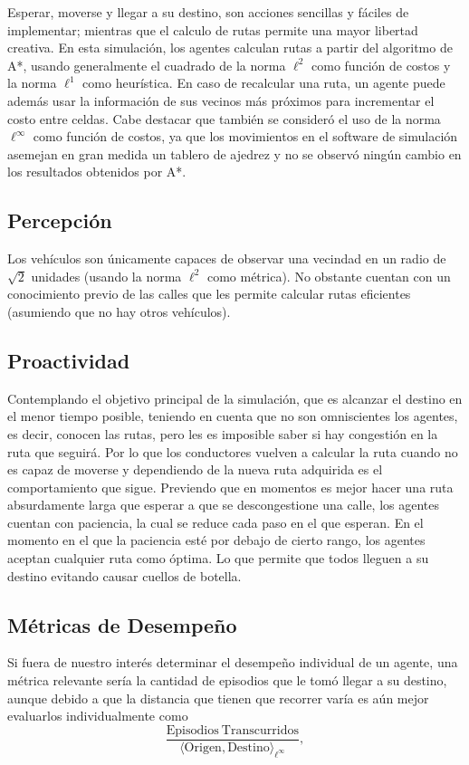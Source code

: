 \documentclass[twoside,11pt]{article}
\begin{document}
Esperar, moverse y llegar a su destino, son acciones sencillas y fáciles
de implementar; mientras que el calculo de rutas permite una mayor libertad
creativa. En esta simulación, los agentes calculan rutas a partir del algoritmo 
de A*, usando generalmente el cuadrado de la norma $\ell^{2}$ como función de costos y 
la norma $\ell^{1}$ como heurística. En caso de recalcular una ruta, un agente puede
además usar la información de sus vecinos más próximos para incrementar el costo
entre celdas. Cabe destacar que también se consideró el uso de la norma $\ell^{\infty}$
como función de costos, ya que los movimientos en el software de simulación asemejan
en gran medida un tablero de ajedrez y no se observó ningún cambio en los resultados
obtenidos por A*.

\subsection{Percepción}
Los vehículos son únicamente capaces de observar una vecindad en un radio de $\sqrt{2}$
unidades (usando la norma $\ell^{2}$ como métrica). No obstante cuentan con un conocimiento
previo de las calles que les permite calcular rutas eficientes (asumiendo que no hay otros
vehículos).

\subsection{Proactividad}
Contemplando el objetivo principal de la simulación, que es alcanzar el destino en el menor tiempo posible, 
teniendo en cuenta que no son omniscientes los agentes, es decir, conocen las rutas, pero les es imposible saber 
si hay congestión en la ruta que seguirá. Por lo que los conductores vuelven a calcular la ruta cuando no es capaz de moverse 
y dependiendo de la nueva ruta adquirida es el comportamiento que sigue. Previendo que en momentos es mejor hacer una ruta absurdamente 
larga que esperar a que se descongestione una calle, los agentes cuentan con paciencia, la cual se reduce cada paso en el que esperan. 
En el momento en el que la paciencia esté por debajo de cierto rango, los agentes aceptan cualquier ruta como óptima. 
Lo que permite que todos lleguen a su destino evitando causar cuellos de botella.

\subsection{Métricas de Desempeño}
Si fuera de nuestro interés determinar el desempeño individual de un agente, una métrica relevante sería 
la cantidad de episodios que le tomó llegar a su destino, aunque debido a que la distancia que tienen que 
recorrer varía es aún mejor evaluarlos individualmente como
\begin{equation}
  \frac{\mathrm{Episodios \ Transcurridos}}{\langle\mathrm{Origen}, \mathrm{Destino}\rangle_{\ell^{\infty}}},
\end{equation}
\end{document}
